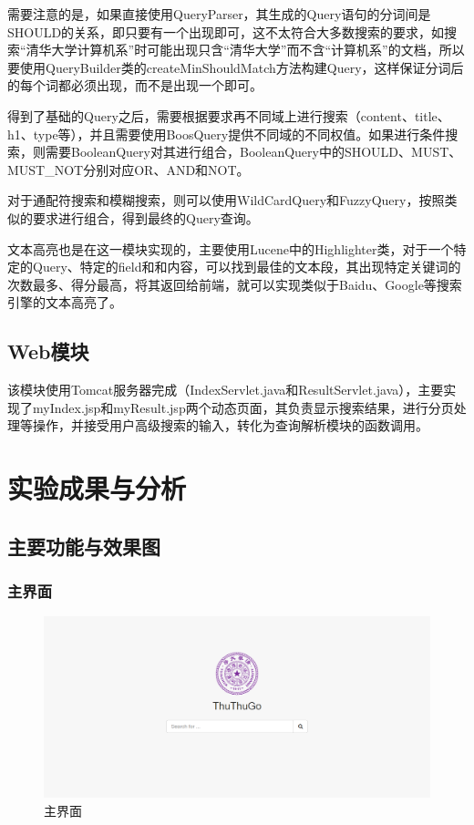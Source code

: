 \documentclass[paper=a4, fontsize=11pt, UTF8]{article} %
\numberwithin{equation}{section} %
\numberwithin{figure}{section} %
\numberwithin{table}{section} %
\begin{document}
需要注意的是，如果直接使用QueryParser，其生成的Query语句的分词间是SHOULD的关系，即只要有一个出现即可，这不太符合大多数搜索的要求，如搜索“清华大学计算机系”时可能出现只含“清华大学”而不含“计算机系”的文档，所以要使用QueryBuilder类的createMinShouldMatch方法构建Query，这样保证分词后的每个词都必须出现，而不是出现一个即可。

得到了基础的Query之后，需要根据要求再不同域上进行搜索（content、title、h1、type等），并且需要使用BoosQuery提供不同域的不同权值。如果进行条件搜索，则需要BooleanQuery对其进行组合，BooleanQuery中的SHOULD、MUST、MUST\_NOT分别对应OR、AND和NOT。

对于通配符搜索和模糊搜索，则可以使用WildCardQuery和FuzzyQuery，按照类似的要求进行组合，得到最终的Query查询。

文本高亮也是在这一模块实现的，主要使用Lucene中的Highlighter类，对于一个特定的Query、特定的field和和内容，可以找到最佳的文本段，其出现特定关键词的次数最多、得分最高，将其返回给前端，就可以实现类似于Baidu、Google等搜索引擎的文本高亮了。

\subsection{Web模块}

该模块使用Tomcat服务器完成（IndexServlet.java和ResultServlet.java），主要实现了myIndex.jsp和myResult.jsp两个动态页面，其负责显示搜索结果，进行分页处理等操作，并接受用户高级搜索的输入，转化为查询解析模块的函数调用。


\section{实验成果与分析}

\subsection{主要功能与效果图}

\subsubsection{主界面}

\begin{figure}[htp]
\center
\includegraphics[width=\textwidth]{ss1}
\caption{主界面} \label{relation}
\end{figure}
\end{document}
